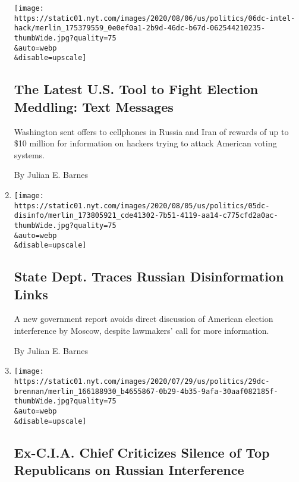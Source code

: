 \begin{enumerate}
  \texttt{[image: https://static01.nyt.com/images/2020/08/06/us/politics/06dc-intel-hack/merlin\_175379559\_0e0ef0a1-2b9d-46dc-b67d-062544210235-thumbWide.jpg?quality=75\\\&auto=webp\\\&disable=upscale]}

  \hypertarget{the-latest-us-tool-to-fight-election-meddling-text-messages}{%
  \subsection{The Latest U.S. Tool to Fight Election Meddling: Text
  Messages}\label{the-latest-us-tool-to-fight-election-meddling-text-messages}}

  Washington sent offers to cellphones in Russia and Iran of rewards of
  up to \$10 million for information on hackers trying to attack
  American voting systems.

  By Julian E. Barnes
\item
  \href{/2020/08/05/us/politics/state-department-russian-disinformation.html}{}

  \texttt{[image: https://static01.nyt.com/images/2020/08/05/us/politics/05dc-disinfo/merlin\_173805921\_cde41302-7b51-4119-aa14-c775cfd2a0ac-thumbWide.jpg?quality=75\\\&auto=webp\\\&disable=upscale]}

  \hypertarget{state-dept-traces-russian-disinformation-links}{%
  \subsection{State Dept. Traces Russian Disinformation
  Links}\label{state-dept-traces-russian-disinformation-links}}

  A new government report avoids direct discussion of American election
  interference by Moscow, despite lawmakers' call for more information.

  By Julian E. Barnes
\item
  \href{/2020/07/29/us/politics/john-brennan-book.html}{}

  \texttt{[image: https://static01.nyt.com/images/2020/07/29/us/politics/29dc-brennan/merlin\_166188930\_b4655867-0b29-4b35-9afa-30aaf082185f-thumbWide.jpg?quality=75\\\&auto=webp\\\&disable=upscale]}

  \hypertarget{ex-cia-chief-criticizes-silence-of-top-republicans-on-russian-interference}{%
  \subsection{Ex-C.I.A. Chief Criticizes Silence of Top Republicans on
  Russian
  Interference}\label{ex-cia-chief-criticizes-silence-of-top-republicans-on-russian-interference}}


\end{enumerate}
